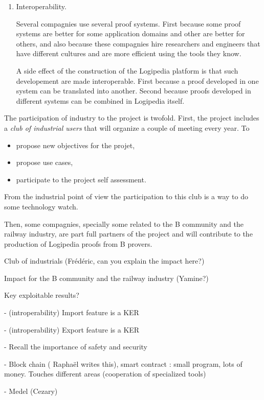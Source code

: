 \begin{enumerate}
\item Interoperability.

Several compagnies use several proof systems. First because some proof
systems are better for some application domains and other are better
for others, and also because these compagnies hire researchers and
engineers that have different cultures and are more efficient using the
tools they know.

A side effect of the construction of the {\sc Logipedia} platform is
that such developement are made interoperable. First because a proof
developed in one system can be translated into another. Second because
proofs developed in different systems can be combined in {\sc
Logipedia} itself.
\end{enumerate}

The participation of industry to the project is twofold. First,
the project includes a {\em club of industrial users} that will
organize a couple of meeting every year. To
\begin{itemize}
\item propose new objectives for the projet,
\item propose use cases,
\item participate to the project self assessment.
\end{itemize}

From the industrial point of view the participation to this club
is a way to do some technology watch. 

Then, some compagnies, specially some related to the {\sc B} community
and the railway industry, are part full partners of the project and
will contribute to the production of {\sc Logipedia} proofs from
{\sc B} provers. 

{\color{red} Club of industrials (Frédéric, can 
you explain the impact here?)}

{\color{red} Impact for the {\sc B} community and the railway industry
  (Yamine?)}

{\color{red} Key exploitable results?}

- (introperability) Import feature is a KER

- (introperability) Export feature is a KER

- Recall the importance of safety and security

- Block chain ({\color{red} Raphaël writes this}), smart contract : small program, lots of money. Touches different areas (cooperation of specialized tools)

- Medel (Cezary)



